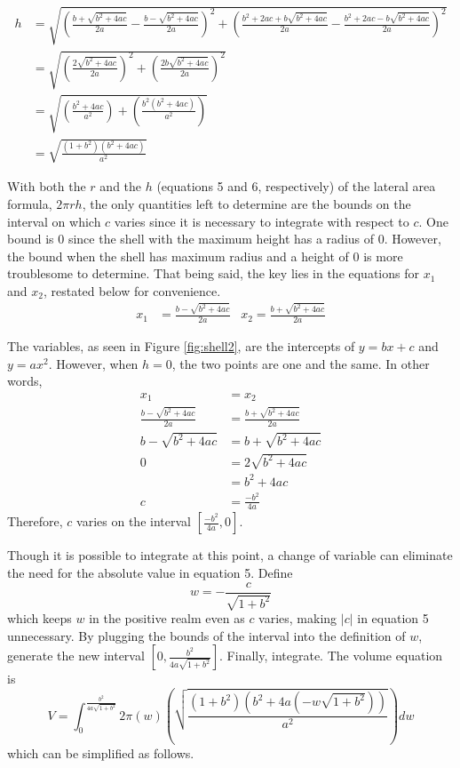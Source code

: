 \documentclass{article}
\begin{document}
\begin{align*}
h &= \sqrt{\left(\frac{b+\sqrt{b^2+4ac}}{2a}-\frac{b-\sqrt{b^2+4ac}}{2a}\right)^2+\left(\frac{b^2+2ac+b\sqrt{b^2+4ac}}{2a}-\frac{b^2+2ac-b\sqrt{b^2+4ac}}{2a}\right)^2}\\
   &= \sqrt{\left(\frac{2\sqrt{b^2+4ac}}{2a}\right)^2+\left(\frac{2b\sqrt{b^2+4ac}}{2a}\right)^2}\\
   &= \sqrt{\left(\frac{b^2+4ac}{a^2}\right)+\left(\frac{b^2\left(b^2+4ac\right)}{a^2}\right)}\\
   &= \sqrt{\frac{\left(1+b^2\right)\left(b^2+4ac\right)}{a^2}}\tag{6}
\end{align*}\par
With both the $r$ and the $h$ (equations 5 and 6, respectively) of the lateral area formula, $2\pi rh$, the only quantities left to determine are the bounds on the interval on which $c$ varies since it is necessary to integrate with respect to $c$. One bound is $0$ since the shell with the maximum height has a radius of $0$. However, the bound when the shell has maximum radius and a height of $0$ is more troublesome to determine. That being said, the key lies in the equations for $x_1$ and $x_2$, restated below for convenience.
\begin{align*}
x_1 &= \frac{b-\sqrt{b^2+4ac}}{2a} & x_2=\frac{b+\sqrt{b^2+4ac}}{2a}
\end{align*}\par
The variables, as seen in Figure \ref{fig:shell2}, are the intercepts of $y=bx+c$ and $y=ax^2$. However, when $h=0$, the two points are one and the same. In other words,
\begin{align*}
x_1 &= x_2\\
\frac{b-\sqrt{b^2+4ac}}{2a} &= \frac{b+\sqrt{b^2+4ac}}{2a}\\
b-\sqrt{b^2+4ac} &= b+\sqrt{b^2+4ac}\\
0 &= 2\sqrt{b^2+4ac}\\
   &= b^2+4ac\\
c &= \frac{-b^2}{4a}\tag{7}
\end{align*}
Therefore, $c$ varies on the interval $\left[\frac{-b^2}{4a},0\right]$.\par
Though it is possible to integrate at this point, a change of variable can eliminate the need for the absolute value in equation 5. Define$$w=-\frac{c}{\sqrt{1+b^2}}$$which keeps $w$ in the positive realm even as $c$ varies, making $|c|$ in equation 5 unnecessary. By plugging the bounds of the interval into the definition of $w$, generate the new interval $\left[0,\frac{b^2}{4a\sqrt{1+b^2}}\right]$. Finally, integrate. The volume equation is$$V=\int_0^{\frac{b^2}{4a\sqrt{1+b^2}}}2\pi\left(w\right)\left(\sqrt{\frac{\left(1+b^2\right)\left(b^2+4a\left(-w\sqrt{1+b^2}\right)\right)}{a^2}}\right)dw$$which can be simplified as follows.\par
\end{document}
